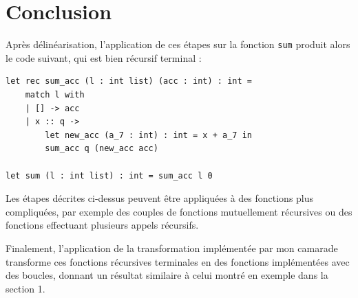 \section{Conclusion}

Après délinéarisation, l'application de ces étapes sur la fonction \texttt{sum}
produit alors le code suivant, qui est bien récursif terminal :

\small
\begin{verbatim}
let rec sum_acc (l : int list) (acc : int) : int =
    match l with
    | [] -> acc
    | x :: q ->
        let new_acc (a_7 : int) : int = x + a_7 in
        sum_acc q (new_acc acc)

let sum (l : int list) : int = sum_acc l 0
\end{verbatim}

\normalsize

Les étapes décrites ci-dessus peuvent être appliquées à des fonctions plus
compliquées, par exemple des couples de fonctions mutuellement récursives ou des
fonctions effectuant plusieurs appels récursifs.

Finalement, l'application de la transformation implémentée par mon camarade
transforme ces fonctions récursives terminales en des fonctions implémentées
avec des boucles, donnant un résultat similaire à celui montré en exemple dans
la section 1.
